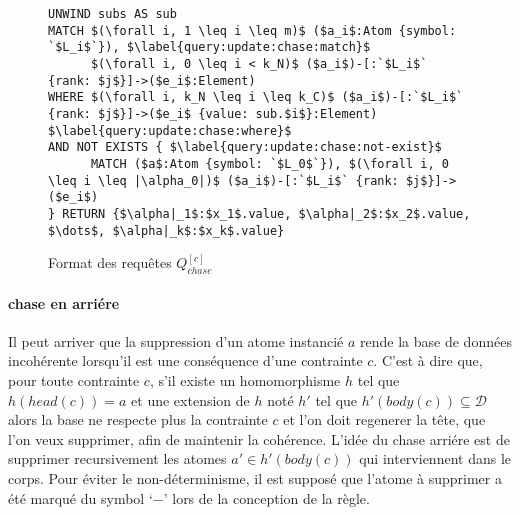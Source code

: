 \begin{figure}[ht]
	\begin{lstlisting}[mathescape]
UNWIND subs AS sub
MATCH $(\forall i, 1 \leq i \leq m)$ ($a_i$:Atom {symbol: `$L_i$`}), $\label{query:update:chase:match}$
      $(\forall i, 0 \leq i < k_N)$ ($a_i$)-[:`$L_i$` {rank: $j$}]->($e_i$:Element)
WHERE $(\forall i, k_N \leq i \leq k_C)$ ($a_i$)-[:`$L_i$` {rank: $j$}]->($e_i$ {value: sub.$i$}:Element) $\label{query:update:chase:where}$
AND NOT EXISTS { $\label{query:update:chase:not-exist}$
      MATCH ($a$:Atom {symbol: `$L_0$`}), $(\forall i, 0 \leq i \leq |\alpha_0|)$ ($a_i$)-[:`$L_i$` {rank: $j$}]->($e_i$)
} RETURN {$\alpha|_1$:$x_1$.value, $\alpha|_2$:$x_2$.value, $\dots$, $\alpha|_k$:$x_k$.value}
	\end{lstlisting}
	\caption{Format des requêtes $Q_{chase}^{[c]}$}
    \label{algo:update:chase:query}
\end{figure}

\begin{example}
    \label{ex:update:chase:query}

\end{example}

\paragraph{\gls{chase} en arriére}
Il peut arriver que la suppression d'un atome instancié $a$ rende la base de données incohérente lorsqu'il est une conséquence d'une contrainte $c$.
C'est à dire que, pour toute contrainte $c$, s'il existe un homomorphisme $h$ tel que $h(head(c)) = a$ et une extension de $h$ noté $h'$ tel que $h'(body(c)) \subseteq \mathcal{D}$ alors la base ne respecte plus la contrainte $c$ et l'on doit regenerer la tête, que l'on veux supprimer, afin de maintenir la cohérence.
L'idée du chase arriére est de supprimer recursivement les atomes $a' \in h'(body(c))$ qui interviennent dans le corps.
Pour éviter le non-déterminisme, il est supposé que l'atome à supprimer a été marqué du symbol `$-$' lors de la conception de la règle.

